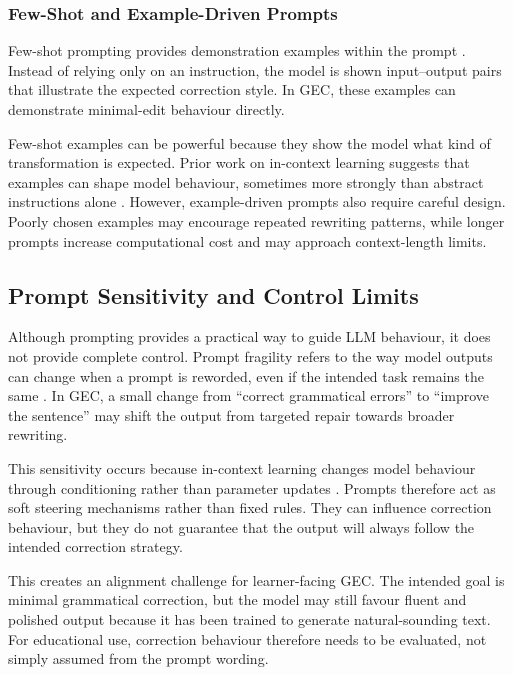 \subsubsection{Few-Shot and Example-Driven Prompts}

Few-shot prompting provides demonstration examples within the prompt \cite{NEURIPS2020_1457c0d6}. Instead of relying only on an instruction, the model is shown input--output pairs that illustrate the expected correction style. In GEC, these examples can demonstrate minimal-edit behaviour directly.

Few-shot examples can be powerful because they show the model what kind of transformation is expected. Prior work on in-context learning suggests that examples can shape model behaviour, sometimes more strongly than abstract instructions alone \cite{liu2023pretrain}. However, example-driven prompts also require careful design. Poorly chosen examples may encourage repeated rewriting patterns, while longer prompts increase computational cost and may approach context-length limits.

\subsection{Prompt Sensitivity and Control Limits}

Although prompting provides a practical way to guide LLM behaviour, it does not provide complete control. Prompt fragility refers to the way model outputs can change when a prompt is reworded, even if the intended task remains the same \cite{liu2023pretrain}. In GEC, a small change from ``correct grammatical errors'' to ``improve the sentence'' may shift the output from targeted repair towards broader rewriting.

This sensitivity occurs because in-context learning changes model behaviour through conditioning rather than parameter updates \cite{NEURIPS2020_1457c0d6}. Prompts therefore act as soft steering mechanisms rather than fixed rules. They can influence correction behaviour, but they do not guarantee that the output will always follow the intended correction strategy.

This creates an alignment challenge for learner-facing GEC. The intended goal is minimal grammatical correction, but the model may still favour fluent and polished output because it has been trained to generate natural-sounding text. For educational use, correction behaviour therefore needs to be evaluated, not simply assumed from the prompt wording.

